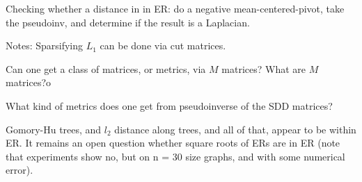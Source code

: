 


Checking whether a distance in in ER: do a negative mean-centered-pivot,
take the pseudoinv, and determine if the result is a Laplacian.

Notes: Sparsifying $L_1$ can be done via cut matrices.

Can one get a class of matrices, or metrics, via $M$ matrices? What are
$M$ matrices?o

What kind of metrics does one get from pseudoinverse of the SDD
matrices?

Gomory-Hu trees, and $l_2$ distance along trees, and all of that, appear
to be within ER. It remains an open question whether square roots of ERs
are in ER (note that experiments show no, but on n = 30 size graphs, and
with some numerical error).


